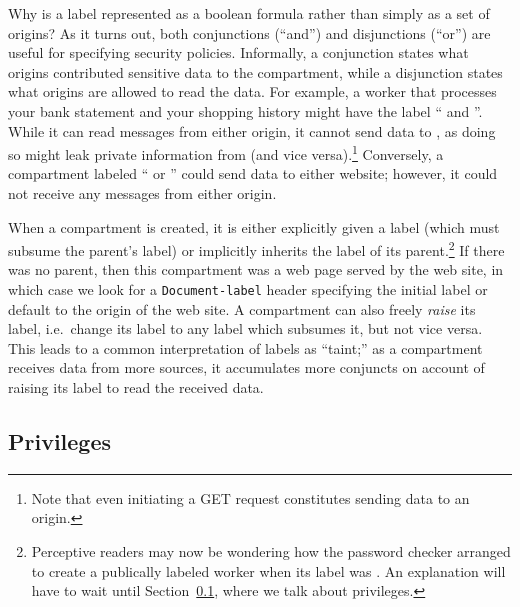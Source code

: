 %
Why is a label represented as a boolean formula rather than simply
as a set of origins?
%
As it turns out, both conjunctions (``and'')
and disjunctions (``or'') are useful for specifying security policies.
%
Informally, a conjunction states what origins contributed sensitive data
to the compartment, while a disjunction states what origins are allowed
to read the data.
%
For example, a worker that processes your bank statement and your shopping
history might have the label `` and ''.
%
While it can read messages from either origin, it cannot send data to
, as doing so might leak private information from
 (and vice versa).\footnote{Note that even initiating a
GET request constitutes sending data to an origin.}
%
Conversely, a compartment labeled `` or ''
could send data to either website; however, it could not receive any
messages from either origin.

When a compartment is created, it is either explicitly given a label
(which must subsume the parent's label) or implicitly inherits the label
of its parent.\footnote{Perceptive readers may now be wondering how
the password checker arranged to create a publically labeled worker
when its label was .  An explanation will have to wait
until Section~\ref{sec:privileges}, where we talk about privileges.}
%
If there was no parent, then this compartment was a web page served
by the web site, in which case we look for a {\tt Document-label} header
specifying the initial label or default to the origin of the web site.
%
A compartment can also freely \emph{raise} its label, i.e.\ change its label
to any label which subsumes it, but not vice versa.
%
This leads to a common interpretation of labels as ``taint;'' as
a compartment receives data from more sources, it accumulates more
conjuncts on account of raising its label to read the received data.

\subsection{Privileges}
\label{sec:privileges}

